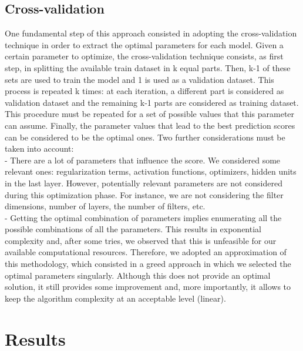 \documentclass[10pt,conference,compsocconf]{IEEEtran}
\begin{document}
\subsection{Cross-validation}
One fundamental step of this approach consisted in adopting the cross-validation technique in order to extract the optimal parameters for each model. Given a certain parameter to optimize, the cross-validation technique consists, as first step, in splitting the available train dataset in k equal parts. Then, k-1 of these sets are used to train the model and 1 is used as a validation dataset. This process is repeated k times: at each iteration, a different part is considered as validation dataset and the remaining k-1 parts are considered as training dataset. This procedure must be repeated for a set of possible values that this parameter can assume. Finally, the parameter values that lead to the best prediction scores can be considered to be the optimal ones.
Two further considerations must be taken into account:\\
- There are a lot of parameters that influence the score. We considered some relevant ones: regularization terms, activation functions, optimizers, hidden units in the last layer. However, potentially relevant parameters are not considered during this optimization phase. For instance, we are not considering the filter dimensions, number of layers, the number of filters, etc. \\
- Getting the optimal combination of parameters implies enumerating all the possible combinations of all the parameters. This results in exponential complexity and, after some tries, we observed that this is unfeasible for our available computational resources. Therefore, we adopted an approximation of this methodology, which consisted in a greed approach in which we selected the optimal parameters singularly. Although this does not provide an optimal solution, it still provides some improvement and, more importantly, it allows to keep the algorithm complexity at an acceptable level (linear). \\



\section{Results}
\label{sec:results}
\end{document}
